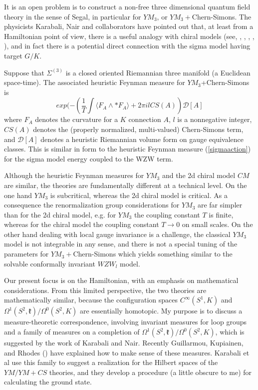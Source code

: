\documentclass{amsart}
\theoremstyle{conjecture}
\theoremstyle{definition}
\theoremstyle{question}
\theoremstyle{questions}
\theoremstyle{remark}
\theoremstyle{remarks}
\theoremstyle{example}
\numberwithin{equation}{section}
\begin{document}
It is an open problem is to construct a non-free three dimensional quantum field theory in the sense of Segal, in particular for $YM_3$, or $YM_3+$Chern-Simons.
The physicists Karabali, Nair and collaborators have pointed out that, at least from a Hamiltonian point of view,
there is a useful analogy with chiral models (see\cite{KKN1}, \cite{KKN2}, \cite{KNY},
\cite{LMY},  \cite{LMY2}, \cite{KN}), and in fact there is a potential direct connection with the sigma model having target $G/K$.

Suppose that $\Sigma^{(3)}$ is a closed oriented Riemannian three manifold (a Euclidean space-time). The associated heuristic Feynman measure
for $YM_3$+Chern-Simons is
$$exp(-(\frac 1T \int\langle F_A\wedge *F_A\rangle+2\pi i l CS(A))\mathcal D[A]$$
where $F_A$ denotes the curvature for a $K$ connection $A$, $l$ is a nonnegative integer, $CS(A)$ denotes
the (properly normalized, multi-valued) Chern-Simons term, and $\mathcal D[A]$ denotes a heuristic Riemannian volume form
on gauge equivalence classes. This is similar in form to the heuristic Feynman measure (\ref{sigmaaction}) for the sigma model energy coupled to the WZW term.

Although the heuristic Feynman measures for $YM_3$ and the 2d chiral model $CM$ are similar, the theories are fundamentally different at a technical level. On the one hand $YM_3$ is subcritical, whereas the 2d chiral model is critical. As a consequence the renormalization group considerations for $YM_3$ are far simpler than for the 2d chiral model, e.g. for $YM_3$ the coupling constant $T$ is finite, whereas for the chiral model
the coupling constant $T \to 0$ on small scales. On the other hand dealing with local gauge invariance is a challenge, the classical $YM_3$ model is not integrable in any sense, and there is not a special tuning of the parameters for $YM_3+$Chern-Simons which yields something similar to the solvable conformally invariant $WZW_l$ model.

Our present focus is on the Hamiltonian, with an emphasis on mathematical considerations. From this limited perspective, the two theories are mathematically similar, because the configuration spaces $C^{\infty}(S^1,K)$ and $\Omega^1(S^2,\mathfrak k)/\Omega^0(S^2,K)$ are essentially homotopic. My purpose is to discuss a measure-theoretic correspondence, involving invariant measures for loop groups and a family of measures on a completion of $\Omega^1(S^2,\mathfrak k)/\Omega^0(S^2,K)$, which is suggested by the work of Karabali and Nair. Recently Guillarmou, Kupiainen, and Rhodes (\cite{GKR}) have explained how to make sense of these measures. Karabali et al use this family to suggest a realization for the Hilbert spaces of the $YM/YM+CS$ theories, and they develop a procedure (a little obscure to me) for calculating the ground state. 
\end{document}
